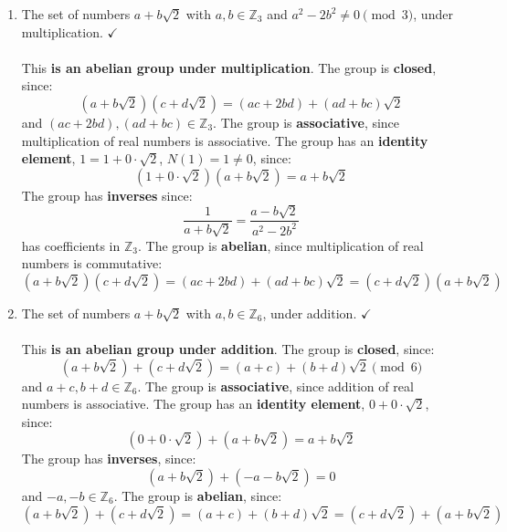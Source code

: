 \documentclass{article}
\newcommand{\Zn}[1]{\mathbb{Z}_{#1}}
\begin{document}
\begin{enumerate}
\begin{enumerate}
            \item The set of numbers $a + b\sqrt{2}$ with $a,b \in \Zn{3}$ and $a^2 - 2b^2 \neq 0 \pmod{3}$, under multiplication. $\checkmark$
            \\
            \\ This \textbf{is an abelian group under multiplication}. The group is \textbf{closed}, since:
            \[
                (a+b\sqrt{2})(c+d\sqrt{2}) = (ac+2bd)+(ad+bc)\sqrt{2}
            \]
            and $(ac+2bd),(ad+bc) \in \Zn{3}$. The group is \textbf{associative}, since multiplication of real numbers is associative. The group has an \textbf{identity element}, $1 = 1+0\cdot\sqrt{2}$, $N(1) = 1 \neq 0$, since:
            \[
                (1+0\cdot\sqrt{2})(a+b\sqrt{2}) = a + b\sqrt{2}
            \]
            The group has \textbf{inverses} since:
            \[
                \frac{1}{a+b\sqrt{2}} = \frac{a-b\sqrt{2}}{a^2-2b^2}
            \]
            has coefficients in $\Zn{3}$. The group is \textbf{abelian}, since multiplication of real numbers is commutative:
            \[
                (a+b\sqrt{2})(c+d\sqrt{2}) = (ac+2bd)+(ad+bc)\sqrt{2} = (c+d\sqrt{2})(a+b\sqrt{2})
            \]

            \item The set of numbers $a + b\sqrt{2}$ with $a,b \in \Zn{6}$, under addition. $\checkmark$
            \\
            \\ This \textbf{is an abelian group under addition}. The group is \textbf{closed}, since:
            \[
                (a + b\sqrt{2}) + (c + d\sqrt{2}) = (a+c) + (b+d)\sqrt{2} \pmod{6}
            \]
            and $a+c, b+d \in \Zn{6}$. The group is \textbf{associative}, since addition of real numbers is associative. The group has an \textbf{identity element}, $0+0\cdot\sqrt{2}$, since:
            \[
                (0+0\cdot\sqrt{2}) + (a+b\sqrt{2}) = a+b\sqrt{2}
            \]
            The group has \textbf{inverses}, since:
            \[
                (a+b\sqrt{2}) + (-a-b\sqrt{2}) = 0
            \]
            and $-a,-b \in \Zn{6}$. The group is \textbf{abelian}, since:
            \[
                (a+b\sqrt{2}) + (c+d\sqrt{2}) = (a+c)+(b+d)\sqrt{2} = (c+d\sqrt{2}) + (a+b\sqrt{2})
            \]


\end{enumerate}
\end{enumerate}
\end{document}
